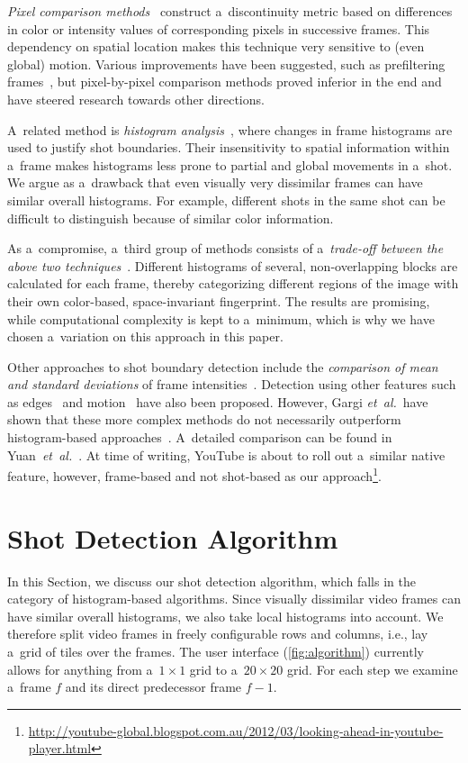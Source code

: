\emph{Pixel comparison methods}~\cite{Hampapur1994, Zhang1993} construct a~discontinuity metric based on differences in color or intensity values of corresponding pixels in successive frames. This dependency on spatial location makes this technique very sensitive to (even global) motion. Various improvements have been suggested, such as prefiltering frames~\cite{Zhang1995}, but pixel-by-pixel comparison methods proved inferior in the end and have steered research towards other directions.

A~related method is \emph{histogram analysis}~\cite{Smeaton1999}, where changes in frame histograms are used to justify shot boundaries. Their insensitivity to spatial information within a~frame makes histograms less prone to partial and global movements in a~shot. We argue as a~drawback that even visually very dissimilar frames can have similar overall histograms. For example, different shots in the same shot can be difficult to distinguish because of similar color information.

As a~compromise, a~third group of methods consists of a~\emph{trade-off between the above two techniques}~\cite{Ahmed1999}. Different histograms of several, non-overlapping blocks are calculated for each frame, thereby categorizing different regions of the image with their own color-based, space-invariant fingerprint. The results are promising, while computational complexity is kept to a~minimum, which is why we have chosen a~variation on this approach in this paper.

Other approaches to shot boundary detection include the \emph{comparison of mean and standard deviations} of frame intensities~\cite{Lienhart1999}. Detection using other features such as edges~\cite{Zabih1995} and motion~\cite{Bouthemy1997} have also been proposed. However, Gargi \emph{et~al.}\ have shown that these more complex methods do not necessarily outperform histogram-based approaches~\cite{Gargi2000}. A~detailed comparison can be found in Yuan~\emph{et~al.}~\cite{Yuan2007}.
At time of writing, YouTube is about to roll out
a~similar native feature, however, frame-based and not shot-based as our approach\footnote{\url{http://youtube-global.blogspot.com.au/2012/03/looking-ahead-in-youtube-player.html}}.

\section{Shot Detection Algorithm} \label{sec:details-of-algo}
In this Section, we discuss our shot detection algorithm, which falls in the category of histogram-based algorithms.  Since visually dissimilar video frames can have similar overall histograms, we also take local histograms into account. 
We therefore split video frames in freely configurable rows and columns, i.e., lay a~grid of tiles over the frames. The user interface (\autoref{fig:algorithm}) currently allows for anything from a~$\mathit{1} \times \mathit{1}$ grid to a~$\mathit{20} \times \mathit{20}$ grid. For each step we examine a~frame $\mathit{f}$ and its direct predecessor frame $\mathit{f - 1}$.

